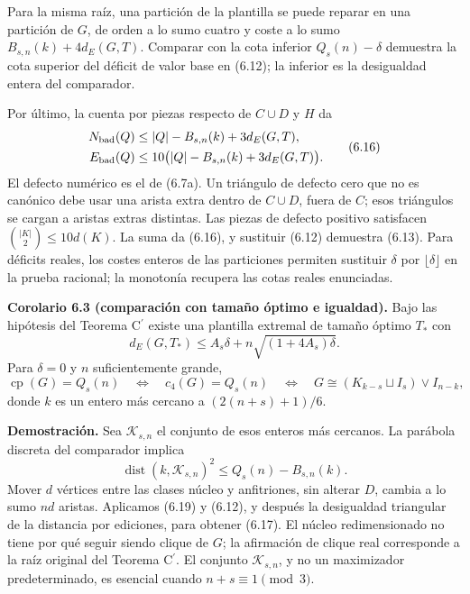 \documentclass[spanish,11pt,a4paper]{article}
\begin{document}
Para la misma raíz, una partición de la plantilla se puede reparar en una partición de \(G\), de orden a lo sumo cuatro y coste a lo sumo \(B_{s,n}(k)+4d_E(G,T)\). Comparar con la cota inferior \(Q_s(n)-\delta\) demuestra la cota superior del déficit de valor base en (6.12); la inferior es la desigualdad entera del comparador.

Por último, la cuenta por piezas respecto de \(C\cup D\) y \(H\) da \[
\begin{aligned}
N_{\rm bad}(Q)&\le |Q|-B_{s,n}(k)+3d_E(G,T),\\
E_{\rm bad}(Q)&\le10\bigl(|Q|-B_{s,n}(k)+3d_E(G,T)\bigr).
\end{aligned}
\tag{6.16}
\] El defecto numérico es el de (6.7a). Un triángulo de defecto cero que no es canónico debe usar una arista extra dentro de \(C\cup D\), fuera de \(C\); esos triángulos se cargan a aristas extras distintas. Las piezas de defecto positivo satisfacen \(\binom{|K|}{2}\le10d(K)\). La suma da (6.16), y sustituir (6.12) demuestra (6.13). Para déficits reales, los costes enteros de las particiones permiten sustituir \(\delta\) por \(\lfloor\delta\rfloor\) en la prueba racional; la monotonía recupera las cotas reales enunciadas.


\textbf{Corolario 6.3 (comparación con tamaño óptimo e igualdad).} Bajo las hipótesis del Teorema \texorpdfstring{C\ensuremath{^{\prime}}}{C'} existe una plantilla extremal de tamaño óptimo \(T_*\) con \[
d_E(G,T_*)\le A_s\delta+n\sqrt{(1+4A_s)\delta}.
\tag{6.17}
\] Para \(\delta=0\) y \(n\) suficientemente grande, \[
\operatorname{cp}(G)=Q_s(n)
\quad\Longleftrightarrow\quad c_4(G)=Q_s(n)
\quad\Longleftrightarrow\quad
G\cong(K_{k-s}\sqcup I_s)\vee I_{n-k},
\tag{6.18}
\] donde \(k\) es un entero más cercano a \((2(n+s)+1)/6\).

\textbf{Demostración.} Sea \(\mathcal K_{s,n}\) el conjunto de esos enteros más cercanos. La parábola discreta del comparador implica \[
\operatorname{dist}(k,\mathcal K_{s,n})^2
\le Q_s(n)-B_{s,n}(k).
\tag{6.19}
\] Mover \(d\) vértices entre las clases núcleo y anfitriones, sin alterar \(D\), cambia a lo sumo \(nd\) aristas. Aplicamos (6.19) y (6.12), y después la desigualdad triangular de la distancia por ediciones, para obtener (6.17). El núcleo redimensionado no tiene por qué seguir siendo clique de \(G\); la afirmación de clique real corresponde a la raíz original del Teorema \texorpdfstring{C\ensuremath{^{\prime}}}{C'}. El conjunto \(\mathcal K_{s,n}\), y no un maximizador predeterminado, es esencial cuando \(n+s\equiv1\pmod3\).
\end{document}
